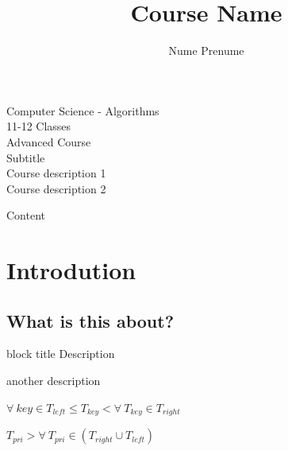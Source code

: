 \documentclass[10pt]{beamer}
\title{Course Name}
\author{Nume \quad Prenume }
\institute{Centrul Infogym Iasi}
\begin{document}
\begin{frame}
    \titlepage
\end{frame}


\begin{frame}
\begin{center}
 Computer Science - Algorithms\\
 11-12 Classes\\
 Advanced Course
\\
\color{gray}
Subtitle \\
 Course description 1\\
Course description 2\\

\end{center}
\end{frame}



\begin{frame}[allowframebreaks]
Content
    \tableofcontents
\end{frame}



\section{Introdution}

\subsection{What is this about?}

\begin{frame}{\insertsubsection}

      \begin{block}{block title}
      	Description

      	another description 

      	$\forall\ key \in T_{left} \leq T_{key} < \forall\ T_{key} \in T_{right}$     

      	$ T_{pri} > \forall\ T_{pri} \in (T_{right} \cup T_{left})$      	
      	
      \end{block}

\end{frame}
\end{document}
